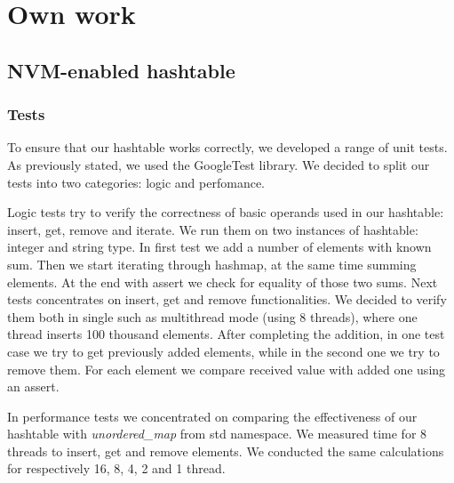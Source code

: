 
\chapter{Own work}

\section{NVM-enabled hashtable}

\subsection{Tests}

    To ensure that our hashtable works correctly, we developed a range of unit tests. As previously stated, we used the GoogleTest library. We decided to split our tests into two categories: logic and perfomance.
    
    Logic tests try to verify the correctness of basic operands used in our hashtable: insert, get, remove and iterate. We run them on two instances of hashtable: integer and string type. In first test we add a number of elements with known sum. Then we start iterating through hashmap, at the same time summing elements. At the end with assert we check for equality of those two sums. Next tests concentrates on insert, get and remove functionalities. We decided to verify them both in single such as multithread mode (using 8 threads), where one thread inserts 100 thousand elements. After completing the addition, in one test case we try to get previously added elements, while in the second one we try to remove them. For each element we compare received value with added one using an assert.
    
    In performance tests we concentrated on comparing the effectiveness of our hashtable with \textit{unordered\_map} from std namespace. We measured time for 8 threads to insert, get and remove elements. We conducted the same calculations for respectively 16, 8, 4, 2 and 1 thread.
    
    
    

        
    



